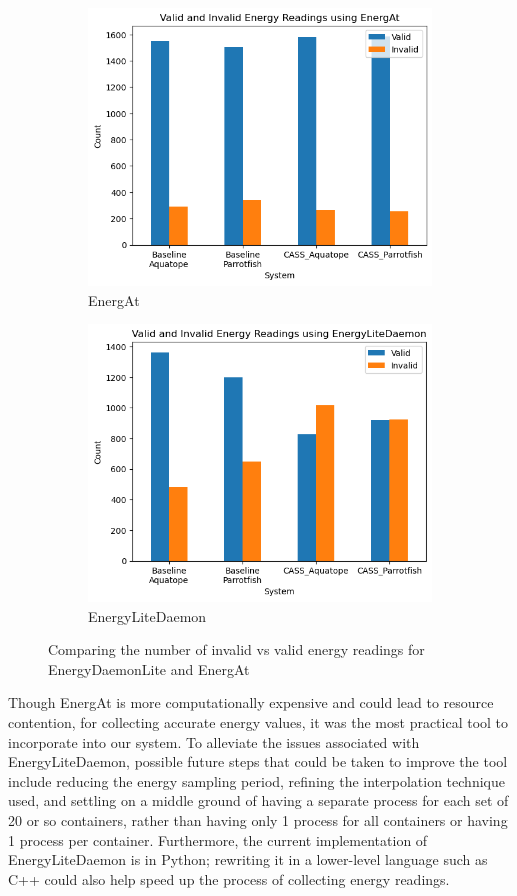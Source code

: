 \documentclass[times, 10pt,twocolumn]{article}
\begin{document}
\begin{figure}[H] %
   \centering
   \begin{subfigure}[b]{0.4\textwidth} %
         \centering
         \includegraphics[width=0.6\linewidth]{imgs/final_experiment_plots/valid_vs_invalid/EnergAt.png}
         \caption{EnergAt}
         \label{fig:energy_tool_efficacy_a}
   \end{subfigure}
   \begin{subfigure}[b]{0.4\textwidth} %
         \centering
         \includegraphics[width=0.6\linewidth]{imgs/final_experiment_plots/valid_vs_invalid/EnergyLiteDaemon.png}
         \caption{EnergyLiteDaemon}
         \label{fig:energy_tool_efficacy_b}
   \end{subfigure}
   
   \caption{Comparing the number of invalid vs valid energy readings for EnergyDaemonLite and EnergAt}
   \label{fig:energy_tool_efficacy}
\end{figure}

Though EnergAt is more computationally expensive and could lead to resource contention, for collecting accurate energy values, it was the most practical tool to incorporate into our system. To alleviate the issues associated with EnergyLiteDaemon, possible future steps that could be taken to improve the tool include reducing the energy sampling period, refining the interpolation technique used, and settling on a middle ground of having a separate process for each set of 20 or so containers, rather than having only 1 process for all containers or having 1 process per container. Furthermore, the current implementation of EnergyLiteDaemon is in Python; rewriting it in a lower-level language such as C++ could also help speed up the process of collecting energy readings.
\end{document}
